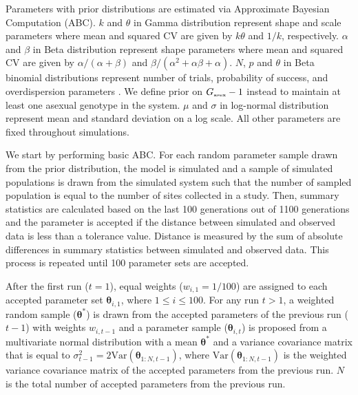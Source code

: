 \documentclass{article}\usepackage[]{graphicx}\usepackage[]{color}
\begin{document}
{\begin{landscape}
\begin{table}[h]
{Parameters with prior distributions are estimated via Approximate Bayesian Computation (ABC).
$k$ and $\theta$ in Gamma distribution represent shape and scale parameters where mean and squared CV are given by $k \theta$ and $1/k$, respectively.
$\alpha$ and $\beta$ in Beta distribution represent shape parameters where mean and squared CV are given by $\alpha/(\alpha+\beta)$ and $\beta/(\alpha^2 + \alpha \beta + \alpha)$.
$N$, $p$ and $\theta$ in Beta binomial distributions represent number of trials, probability of success, and overdispersion parameters \citep{morris1983natural}.
We define prior on $G_{\textrm{\tiny asex}} -1$ instead to maintain at least one asexual genotype in the system.
$\mu$ and $\sigma$ in log-normal distribution represent mean and standard deviation on a log scale.
All other parameters are fixed throughout simulations.
}
\label{tb:param}
\end{table}
\end{landscape}
}

We start by performing basic ABC.
For each random parameter sample drawn from the prior distribution, the model is simulated and a sample of simulated populations is drawn from the simulated system such that the number of sampled population is equal to the number of sites collected in a study.
Then, summary statistics are calculated based on the last 100 generations out of 1100 generations and the parameter is accepted if the distance between simulated and observed data is less than a tolerance value.
Distance is measured by the sum of absolute differences in summary statistics between simulated and observed data.
This process is repeated until 100 parameter sets are accepted.

After the first run ($t=1$), equal weights ($w_{i,1}=1/100$) are assigned to each accepted parameter set $\bm\theta_{i, 1}$, where $1 \leq i \leq 100$.
For any run $t > 1$,
a weighted random sample ($\bm\theta^\ast$) is drawn from the accepted parameters of the previous run ($t-1$) with weights $w_{i,t-1}$ and
a parameter sample ($\bm\theta_{i, t}$) is proposed from a multivariate normal distribution with a mean $\bm\theta^\ast$ and a variance covariance matrix that is equal to $\sigma_{t-1}^2=2 \mathrm{Var}(\bm\theta_{1:N, t-1})$, where $\mathrm{Var}(\bm\theta_{1:N, t-1})$ is the weighted variance covariance matrix of the accepted parameters from the previous run.
$N$ is the total number of accepted parameters from the previous run.
\end{document}

